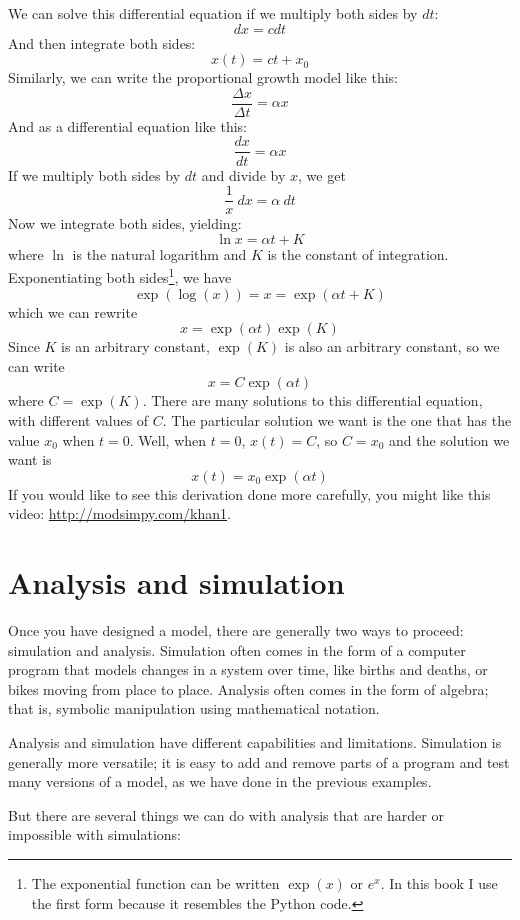 \documentclass[12pt]{book}
\theoremstyle{exercise}
\begin{document}
We can solve this differential equation if we multiply both sides by $dt$:
%
\[ dx = c dt \]
%
And then integrate both sides:
%
\[ x(t) = c t + x_0 \]
%
Similarly, we can write the proportional growth model like this:
%
\[ \frac{\Delta x}{\Delta t} = \alpha x \]
%
And as a differential equation like this:
%
\[ \frac{dx}{dt} = \alpha x \]
%
If we multiply both sides by $dt$ and divide by $x$, we get
%
\[ \frac{1}{x}~dx = \alpha~dt \] 
%
Now we integrate both sides, yielding:
%
\[ \ln x = \alpha t + K \]
%
where $\ln$ is the natural logarithm and $K$ is the constant of integration.  Exponentiating both sides\footnote{The exponential function can be written $\exp(x)$ or $e^x$.  In this book I use the first form because it resembles the Python code. }, we have
%
\[ \exp(\log(x)) = x = \exp(\alpha t + K) \]
%
which we can rewrite
%
\[ x = \exp(\alpha t) \exp(K) \]
%
Since $K$ is an arbitrary constant, $\exp(K)$ is also an arbitrary constant, so we can write
%
\[ x = C \exp(\alpha t) \]
%
where $C = \exp(K)$.  There are many solutions to this differential equation, with different values of $C$.  The particular solution we want is the one that has the value $x_0$ when $t=0$.  Well, when $t=0$, $x(t) = C$, so $C = x_0$ and the solution we want is
%
\[ x(t) = x_0 \exp(\alpha t) \]
%
If you would like to see this derivation done more carefully, you might like this video: \url{http://modsimpy.com/khan1}.

\section{Analysis and simulation}

Once you have designed a model, there are generally two ways to proceed: simulation and analysis.  Simulation often comes in the form of a computer program that models changes in a system over time, like births and deaths, or bikes moving from place to place.  Analysis often comes in the form of algebra; that is, symbolic manipulation using mathematical notation.

Analysis and simulation have different capabilities and limitations.  Simulation is generally more versatile; it is easy to add and remove parts of a program and test many versions of a model, as we have done in the previous examples.

But there are several things we can do with analysis that are harder or impossible with simulations:
\end{document}
